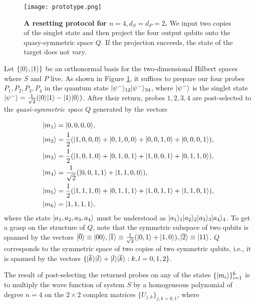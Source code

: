 \documentclass[twocolumn,prx,aps,longbibliography]{revtex4-1}
\begin{document}
\begin{figure}
  \centering
  \texttt{[image: prototype.png]}
  \caption{\textbf{A resetting protocol for $n=4, d_S=d_P=2$.} We input two copies of the singlet state and then project the four output qubits onto the quasy-symmetric space $Q$. If the projection succeeds, the state of the target does not vary.}
  \label{proto}
\end{figure}

Let $\{|0\rangle,|1\rangle\}$ be an orthonormal basis for the two-dimensional Hilbert spaces where $S$ and $P$ live. As shown in Figure \ref{proto}, it suffices to prepare our four probes $P_1,P_2,P_3,P_4$ in the quantum state $|\psi^{-}\rangle_{12}|\psi^{-}\rangle_{34}$, where $|\psi^{-}\rangle$ is the singlet state $|\psi^{-}\rangle=\frac{1}{\sqrt{2}}(|0\rangle|1\rangle-|1\rangle|0\rangle)$. After their return, probes $1,2,3,4$ are post-selected to the \emph{quasi-symmetric space} $Q$ generated by the vectors

\begin{eqnarray}
&|m_1\rangle=|0,0,0,0\rangle,\nonumber\\
&|m_2\rangle=\frac{1}{2}(|1,0,0,0\rangle+|0,1,0,0\rangle+|0,0,1,0\rangle+|0,0,0,1\rangle),\nonumber\\
&|m_3\rangle=\frac{1}{2}(|1,0,1,0\rangle+|0,1,0,1\rangle+|1,0,0,1\rangle+|0,1,1,0\rangle),\nonumber\\
&|m_4\rangle=\frac{1}{\sqrt{2}}(|0,0,1,1\rangle+|1,1,0,0\rangle),\nonumber\\
&|m_5\rangle=\frac{1}{2}(|1,1,1,0\rangle+|0,1,1,1\rangle+|1,0,1,1\rangle+|1,1,0,1\rangle),\nonumber\\
&|m_6\rangle=|1,1,1,1\rangle,
\label{quasi_sym}
\end{eqnarray}
\noindent where the state $|a_1,a_2,a_3,a_4\rangle$ must be understood as $|a_1\rangle_{1}|a_2\rangle_{2}|a_3\rangle_{3}|a_4\rangle_{4}$. To get a grasp on the structure of $Q$, note that the symmetric subspace of two qubits is spanned by the vectors $|\overline{0}\rangle\equiv|00\rangle,|\overline{1}\rangle\equiv\frac{1}{\sqrt{2}}(|0,1\rangle+|1,0\rangle),|\overline{2}\rangle\equiv|11\rangle$. $Q$ corresponds to the symmetric space of two copies of two symmetric qubits, i.e., it is spanned by the vectors $\{|\overline{k}\rangle|\overline{l}\rangle+|\overline{l}\rangle|\overline{k}\rangle:k,l=0,1,2\}$.

The result of post-selecting the returned probes on any of the states $\{|m_i\rangle\}_{i=1}^6$ is to multiply the wave function of system $S$ by a homogeneous polynomial of degree $n=4$ on the $2\times 2$ complex matrices $\{U_{j,k}\}_{j,k=0,1}$, where 
\end{document}
